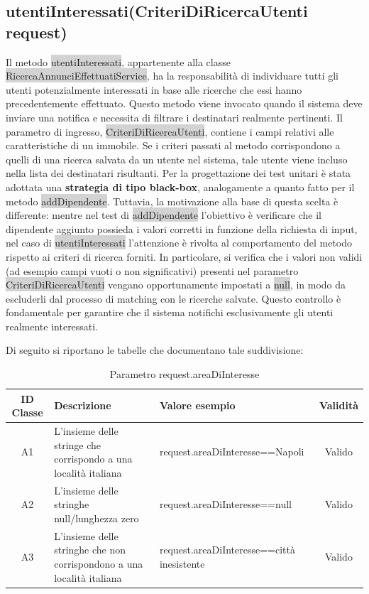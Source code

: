 \subsection{utentiInteressati(CriteriDiRicercaUtenti request)}

Il metodo \colorbox{lightgray}{utentiInteressati}, appartenente alla classe \colorbox{lightgray}{RicercaAnnunciEffettuatiService}, ha la responsabilità di individuare tutti gli utenti potenzialmente interessati in base alle ricerche che essi hanno precedentemente effettuato.
Questo metodo viene invocato quando il sistema deve inviare una notifica e necessita di filtrare i destinatari realmente pertinenti. Il parametro di ingresso, \colorbox{lightgray}{CriteriDiRicercaUtenti}, contiene i campi relativi alle caratteristiche di un immobile. Se i criteri passati al metodo corrispondono a quelli di una ricerca salvata da un utente nel sistema, tale utente viene incluso nella lista dei destinatari risultanti.
\newline
Per la progettazione dei test unitari è stata adottata una \textbf{strategia di tipo black-box}, analogamente a quanto fatto per il metodo \colorbox{lightgray} {addDipendente}. Tuttavia, la motivazione alla base di questa scelta è differente: mentre nel test di \colorbox{lightgray}{addDipendente} l’obiettivo è verificare che il dipendente aggiunto possieda i valori corretti in funzione della richiesta di input, nel caso di \colorbox{lightgray}{utentiInteressati} l’attenzione è rivolta al comportamento del metodo rispetto ai criteri di ricerca forniti.
In particolare, si verifica che i valori non validi (ad esempio campi vuoti o non significativi) presenti nel parametro \colorbox{lightgray}{CriteriDiRicercaUtenti} vengano opportunamente impostati a \colorbox{lightgray}{null}, in modo da escluderli dal processo di matching con le ricerche salvate. Questo controllo è fondamentale per garantire che il sistema notifichi esclusivamente gli utenti realmente interessati.

Di seguito si riportano le tabelle che documentano tale suddivisione:

\begin{table}[H]
	\centering
	\begin{tabular}{|c|p{4cm}|p{6cm}|c|} 
		\hline
		\textbf{ID Classe} & \textbf{Descrizione} & \textbf{Valore esempio} & \textbf{Validità} \\
		\hline
		A1 & L'insieme delle stringe che corrispondo a una località italiana
		& request.areaDiInteresse==Napoli & Valido \\
		\hline
		A2 & L'insieme delle stringhe null/lunghezza zero
		& request.areaDiInteresse==null & Valido \\
		\hline
		A3 & L'insieme delle stringhe che non corrispondono a una località italiana
		& request.areaDiInteresse==città inesistente & Valido \\
		\hline
	\end{tabular}
	\caption{Parametro request.areaDiInteresse}
	\label{tab:placeholder}
\end{table}

